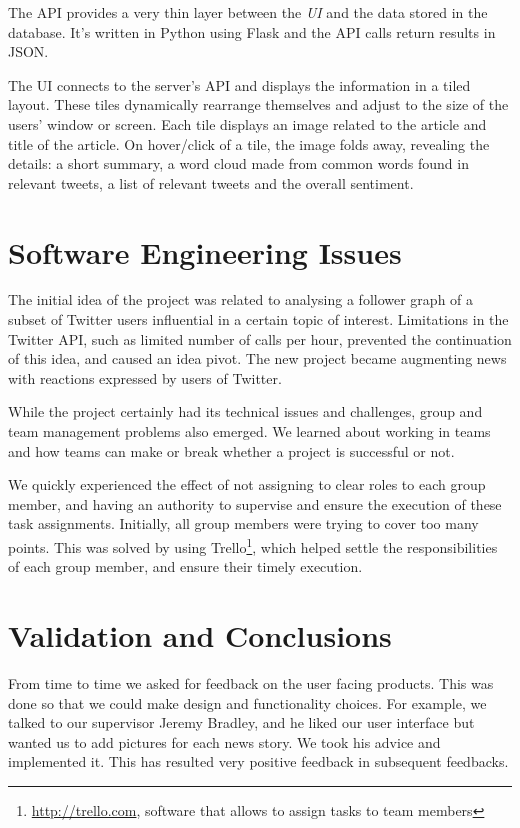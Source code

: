 \documentclass[a4paper]{article}
\begin{document}
	 The API provides a very thin layer between the \emph{UI} and the data stored in the database. It's written in Python using Flask and the API calls return results in JSON.
	 
	 The UI connects to the server's API and displays the information in a tiled layout. These tiles dynamically rearrange themselves and adjust to the size of the users' window or screen. Each tile displays an image related to the article and title of the article. On hover/click of a tile, the image folds away, revealing the details: a short summary, a word cloud made from common words found in relevant tweets, a list of relevant tweets and the overall sentiment.
  
  \section{Software Engineering Issues}
  
	The initial idea of the project was related to analysing a follower graph of a subset of Twitter users influential in a certain topic of interest. Limitations in the Twitter API, such as limited number of calls per hour, prevented the continuation of this idea, and caused an idea pivot. The new project became augmenting news with reactions expressed by users of Twitter.
  
	While the project certainly had its technical issues and challenges, group and team management problems also emerged. We learned about working in teams and how teams can make or break whether a project is successful or not. 
	
	We quickly experienced the effect of not assigning to clear roles to each group member, and having an authority to supervise and ensure the execution of these task assignments. Initially, all group members were trying to cover too many points. This was solved by using Trello\footnote{\url{http://trello.com}, software that allows to assign tasks to team members}, which helped settle the responsibilities of each group member, and ensure their timely execution.
	
  
  \section{Validation and Conclusions}
  
	From time to time we asked for feedback on the user facing products. This was done so that we could make design and functionality choices. For example, we talked to our supervisor Jeremy Bradley, and he liked our user interface but wanted us to add pictures for each news story. We took his advice and implemented it. This has resulted very positive feedback in subsequent feedbacks.
	
\end{document}
